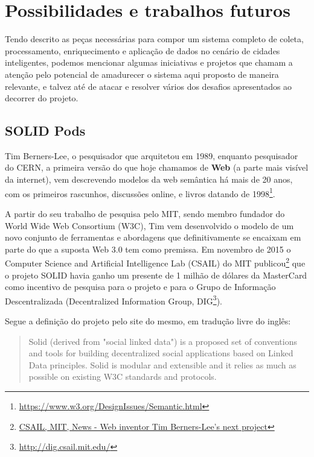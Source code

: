 \chapter{Possibilidades e trabalhos futuros} \label{c:possibilidades_trabalhos_futuros}

Tendo descrito as peças necessárias para compor um sistema completo de coleta, processamento, enriquecimento e aplicação de dados no cenário de cidades inteligentes, podemos mencionar algumas iniciativas e projetos que chamam a atenção pelo potencial de amadurecer o sistema aqui proposto de maneira relevante, e talvez até de atacar e resolver vários dos desafios apresentados ao decorrer do projeto.

\section{SOLID Pods}

Tim Berners-Lee, o pesquisador que arquitetou em 1989, enquanto pesquisador do CERN, a primeira versão do que hoje chamamos de \textbf{Web} (a parte mais visível da internet), vem descrevendo modelos da web semântica há mais de 20 anos, com os primeiros rascunhos, discussões online, e livros \cite{berners2001weaving} datando de 1998\footnote{\url{https://www.w3.org/DesignIssues/Semantic.html}}.

A partir do seu trabalho de pesquisa pelo MIT, sendo membro fundador do World Wide Web Consortium (W3C), Tim vem desenvolvido o modelo de um novo conjunto de ferramentas e abordagens que definitivamente se encaixam em parte do que a suposta Web 3.0 tem como premissa. Em novembro de 2015 o Computer Science and Artificial Intelligence Lab (CSAIL) do MIT publicou\footnote{\href{https://www.csail.mit.edu/news/web-inventor-tim-berners-lees-next-project-platform-gives-users-control-their-data}{CSAIL, MIT, News - Web inventor Tim Berners-Lee's next project}} que o projeto SOLID havia ganho um presente de 1 milhão de dólares da MasterCard como incentivo de pesquisa para o projeto e para o Grupo de Informação Descentralizada (Decentralized Information Group, DIG\footnote{\url{http://dig.csail.mit.edu/}}).

Segue a definição do projeto pelo site do mesmo, em tradução livre do inglês:

\begin{quote}
    Solid (derived from "social linked data") is a proposed set of conventions and tools for building decentralized social applications based on Linked Data principles. Solid is modular and extensible and it relies as much as possible on existing W3C standards and protocols.
\end{quote}

